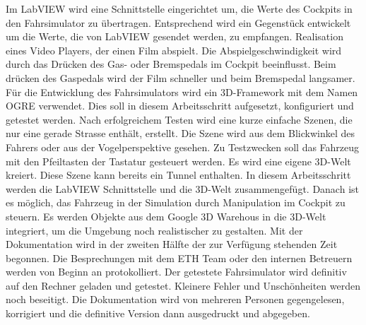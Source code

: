 Im LabVIEW wird eine Schnittstelle eingerichtet um, die Werte des Cockpits in den Fahrsimulator zu übertragen. Entsprechend wird ein Gegenstück entwickelt um die Werte, die von LabVIEW gesendet werden, zu empfangen. 
Realisation eines Video Players, der einen Film abspielt. Die Abspielgeschwindigkeit wird durch das Drücken des Gas- oder Bremspedals im Cockpit beeinflusst. Beim drücken des Gaspedals wird der Film schneller und beim Bremspedal langsamer. 
Für die Entwicklung des Fahrsimulators wird ein 3D-Framework mit dem Namen OGRE verwendet. Dies soll in diesem Arbeitsschritt aufgesetzt, konfiguriert und getestet werden. Nach erfolgreichem Testen wird eine kurze einfache Szenen, die nur eine gerade Strasse enthält, erstellt. Die Szene wird aus dem Blickwinkel des Fahrers oder aus der Vogelperspektive gesehen. Zu Testzwecken soll das Fahrzeug mit den Pfeiltasten der Tastatur gesteuert werden.
Es wird eine eigene 3D-Welt kreiert. Diese Szene kann bereits ein Tunnel enthalten. 
In diesem Arbeitsschritt werden die LabVIEW Schnittstelle und die 3D-Welt zusammengefügt. Danach ist es möglich, das Fahrzeug in der Simulation durch Manipulation im Cockpit zu steuern. 
Es werden Objekte aus dem Google 3D Warehous in die 3D-Welt integriert, um die Umgebung noch realistischer zu gestalten. 
Mit der Dokumentation wird in der zweiten Hälfte der zur Verfügung stehenden Zeit begonnen. Die Besprechungen mit dem ETH Team oder den internen Betreuern werden von Beginn an protokolliert.
Der getestete Fahrsimulator wird definitiv auf den Rechner geladen und getestet. Kleinere Fehler und Unschönheiten werden noch beseitigt. 
Die Dokumentation wird von mehreren Personen gegengelesen, korrigiert und die definitive Version dann ausgedruckt und abgegeben. 